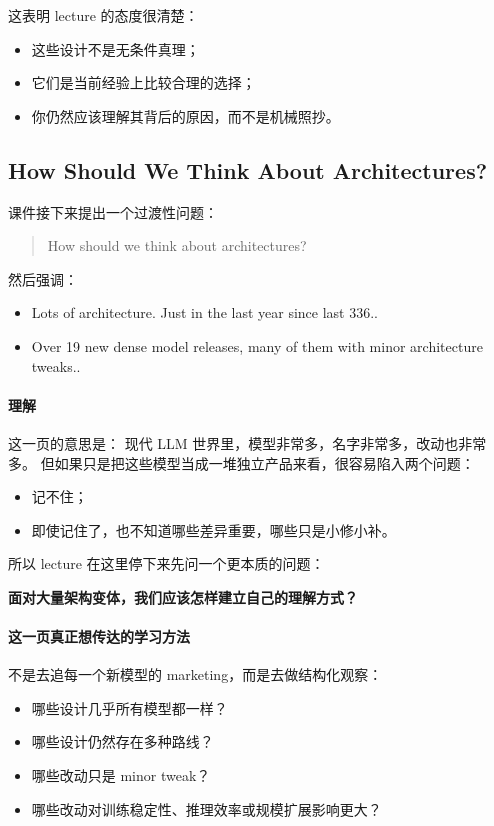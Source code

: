 \documentclass[a4paper,UTF8]{article}
\numberwithin{equation}{section}
\begin{document}
这表明 lecture 的态度很清楚：
\begin{itemize}
    \item 这些设计不是无条件真理；
    \item 它们是当前经验上比较合理的选择；
    \item 你仍然应该理解其背后的原因，而不是机械照抄。
\end{itemize}

\subsection{How Should We Think About Architectures?}

课件接下来提出一个过渡性问题：
\begin{quote}
How should we think about architectures?
\end{quote}

然后强调：
\begin{itemize}
    \item Lots of architecture. Just in the last year since last 336..
    \item Over 19 new dense model releases, many of them with minor architecture tweaks..
\end{itemize}

\paragraph{理解}
这一页的意思是：  
现代 LLM 世界里，模型非常多，名字非常多，改动也非常多。  
但如果只是把这些模型当成一堆独立产品来看，很容易陷入两个问题：

\begin{itemize}
    \item 记不住；
    \item 即使记住了，也不知道哪些差异重要，哪些只是小修小补。
\end{itemize}

所以 lecture 在这里停下来先问一个更本质的问题：

\begin{center}
\textbf{面对大量架构变体，我们应该怎样建立自己的理解方式？}
\end{center}

\paragraph{这一页真正想传达的学习方法}
不是去追每一个新模型的 marketing，而是去做结构化观察：
\begin{itemize}
    \item 哪些设计几乎所有模型都一样？
    \item 哪些设计仍然存在多种路线？
    \item 哪些改动只是 minor tweak？
    \item 哪些改动对训练稳定性、推理效率或规模扩展影响更大？
\end{itemize}
\end{document}

